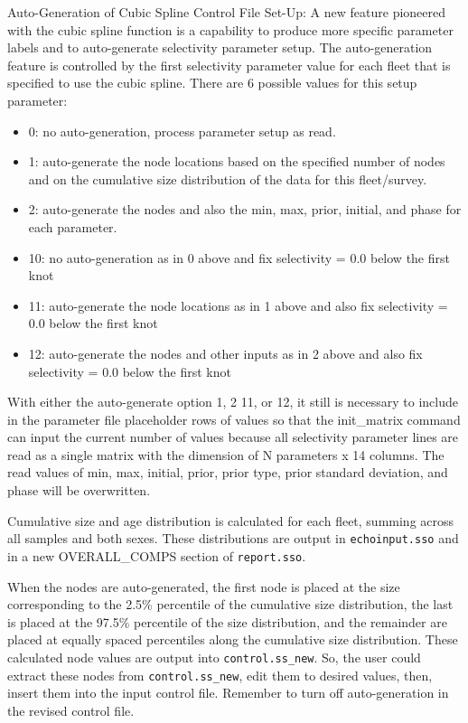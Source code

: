 Auto-Generation of Cubic Spline Control File Set-Up: A new feature pioneered with the cubic spline function is a capability to produce more specific parameter labels and to auto-generate selectivity parameter setup. The auto-generation feature is controlled by the first selectivity parameter value for each fleet that is specified to use the cubic spline. There are 6 possible values for this setup parameter:
	\begin{itemize}
		\item 0: no auto-generation, process parameter setup as read.
		\item 1: auto-generate the node locations based on the specified number of nodes and on the cumulative size distribution of the data for this fleet/survey.
		\item 2: auto-generate the nodes and also the min, max, prior, initial, and phase for each parameter. 
		\item 10: no auto-generation as in 0 above and fix selectivity = 0.0 below the first knot
		\item 11: auto-generate the node locations as in 1 above and also fix selectivity = 0.0 below the first knot
		\item 12: auto-generate the nodes and other inputs as in 2 above and also fix selectivity = 0.0 below the first knot 
	\end{itemize}
	
With either the auto-generate option 1, 2 11, or 12, it still is necessary to include in the parameter file placeholder rows of values so that the init\_matrix command can input the current number of values because all selectivity parameter lines are read as a single matrix with the dimension of N parameters x 14 columns. The read values of min, max, initial, prior, prior type, prior standard deviation, and phase will be overwritten.
	
Cumulative size and age distribution is calculated for each fleet, summing across all samples and both sexes. These distributions are output in \texttt{echoinput.sso} and in a new OVERALL\_COMPS section of \texttt{report.sso}.
	
When the nodes are auto-generated, the first node is placed at the size corresponding to the 2.5\% percentile of the cumulative size distribution, the last is placed at the 97.5\% percentile of the size distribution, and the remainder are placed at equally spaced percentiles along the cumulative size distribution. These calculated node values are output into \texttt{control.ss\_new}. So, the user could extract these nodes from \texttt{control.ss\_new}, edit them to desired values, then, insert them into the input control file. Remember to turn off auto-generation in the revised control file.
	
